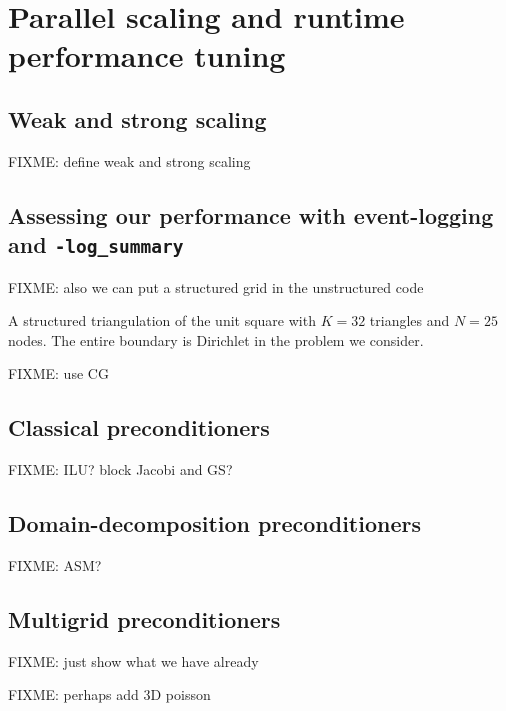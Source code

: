 
\chapter{Parallel scaling and runtime performance tuning}
\label{chap:scaling}

\section{Weak and strong scaling}

FIXME: define weak and strong scaling

\section{Assessing our performance with event-logging and \texttt{-log\_summary}}

\vspace{4cm}

FIXME: also we can put a structured grid in the unstructured code

\begin{marginfigure}

\caption{A structured triangulation of the unit square with $K=32$ triangles and $N=25$ nodes.  The entire boundary is Dirichlet in the problem we consider.}
\label{fig:structuredfem}
\end{marginfigure}

FIXME: use CG

\section{Classical preconditioners}

FIXME:  ILU?  block Jacobi and GS?

\section{Domain-decomposition preconditioners}

FIXME: ASM?

\section{Multigrid preconditioners}

FIXME: just show what we have already

FIXME: perhaps add 3D poisson

